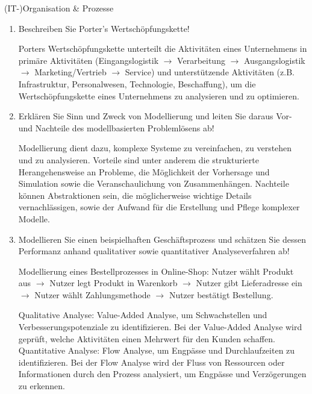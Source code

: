 \documentclass{article}
\begin{document}
\begin{exercise}{(IT-)Organisation \& Prozesse}
  \begin{enumerate}
    \item Beschreiben Sie Porter's Wertschöpfungskette!
          \begin{solution}
            Porters Wertschöpfungskette unterteilt die Aktivitäten eines Unternehmens in primäre Aktivitäten (Eingangslogistik $\to$ Verarbeitung $\to$ Ausgangslogistik $\to$ Marketing/Vertrieb $\to$ Service) und unterstützende Aktivitäten (z.B. Infrastruktur, Personalwesen, Technologie, Beschaffung), um die Wertschöpfungskette eines Unternehmens zu analysieren und zu optimieren.
          \end{solution}

    \item Erklären Sie Sinn und Zweck von Modellierung und leiten Sie daraus Vor- und Nachteile des modellbasierten Problemlösens ab!
          \begin{solution}
            Modellierung dient dazu, komplexe Systeme zu vereinfachen, zu verstehen und zu analysieren. Vorteile sind unter anderem die strukturierte Herangehensweise an Probleme, die Möglichkeit der Vorhersage und Simulation sowie die Veranschaulichung von Zusammenhängen. Nachteile können Abstraktionen sein, die möglicherweise wichtige Details vernachlässigen, sowie der Aufwand für die Erstellung und Pflege komplexer Modelle.
          \end{solution}

    \item Modellieren Sie einen beispielhaften Geschäftsprozess und schätzen Sie dessen Performanz anhand qualitativer sowie quantitativer Analyseverfahren ab!
          \begin{solution}
            Modellierung eines Bestellprozesses in Online-Shop: Nutzer wählt Produkt aus $\to$ Nutzer legt Produkt in Warenkorb $\to$ Nutzer gibt Lieferadresse ein $\to$ Nutzer wählt Zahlungsmethode $\to$ Nutzer bestätigt Bestellung.

            Qualitative Analyse: Value-Added Analyse, um Schwachstellen und Verbesserungspotenziale zu identifizieren. Bei der Value-Added Analyse wird geprüft, welche Aktivitäten einen Mehrwert für den Kunden schaffen.
            Quantitative Analyse: Flow Analyse, um Engpässe und Durchlaufzeiten zu identifizieren. Bei der Flow Analyse wird der Fluss von Ressourcen oder Informationen durch den Prozess analysiert, um Engpässe und Verzögerungen zu erkennen.
          \end{solution}


\end{enumerate}
\end{exercise}
\end{document}
